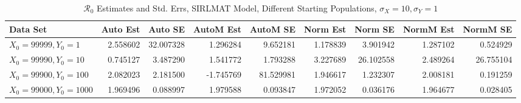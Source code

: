 \documentclass[12pt]{article}
\newcommand{\rr}{\ensuremath{\mathcal{R}_0}}
\begin{document}
\begin{table}[H]
	
	\caption{$\rr$ Estimates and Std. Errs, SIRLMAT Model,
		Different Starting Populations, 
		$\sigma_X = 10, \sigma_Y = 1$}
	\begin{footnotesize}
		\hskip -1.7cm
		\begin{tabular}{l|r|r|r|r|r|r|r|r}
			Data Set & Auto Est & Auto SE & AutoM Est & AutoM SE & Norm Est & Norm SE & NormM Est & NormM SE\\
			\hline
			$X_0 = 99999, Y_0 = 1$ & 2.558602 & 32.007328 & 1.296284 & 9.652181 & 1.178839 & 3.901942 & 1.287102 & 0.524929\\
			\hline
			$X_0 = 99990, Y_0 = 10$ & 0.745127 & 3.487290 & 1.541772 & 1.793288 & 3.227689 & 26.102558 & 2.489264 & 26.755104\\
			\hline
			$X_0 = 99900, Y_0 = 100$ & 2.082023 & 2.181500 & -1.745769 & 81.529981 & 1.946617 & 1.232307 & 2.008181 & 0.191259\\
			\hline
			$X_0 = 99000, Y_0 = 1000$ & 1.969496 & 0.088997 & 1.979588 & 0.093847 & 1.972052 & 0.036176 & 1.964677 & 0.028405\\
			\hline
		\end{tabular}
	\end{footnotesize}
\end{table}
\end{document}
